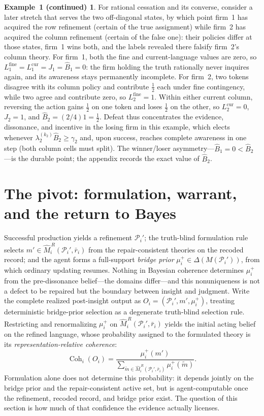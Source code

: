 \documentclass[11pt]{article}
\theoremstyle{definition}
\newtheorem*{excont}{Example~1 (continued)}
\begin{document}
\begin{excont}
For rational cessation and its converse, consider a later stretch that serves the two off-diagonal states, by which point firm~1 has acquired the row refinement (certain of the true assignment) while firm~2 has acquired the column refinement (certain of the false one): their policies differ at those states, firm~1 wins both, and the labels revealed there falsify firm~2's column theory.
For firm~1, both the fine and current-language values are zero, so $L_1^{\mathrm{fine}}=L_1^{\mathrm{cur}}=J_1=\widehat B_1=0$: the firm holding the truth rationally never inquires again, and its awareness stays permanently incomplete.
For firm~2, two tokens disagree with its column policy and contribute $\tfrac12$ each under fine contingency, while two agree and contribute zero, so $L_2^{\mathrm{fine}}=1$.
Within either current column, reversing the action gains $\tfrac12$ on one token and loses $\tfrac12$ on the other, so $L_2^{\mathrm{cur}}=0$, $J_2=1$, and $\widehat B_2=(2/4)1=\tfrac12$.
Defeat thus concentrates the evidence, dissonance, and incentive in the losing firm in this example, which elects whenever $\lambda_2^{(k_2)}\widehat B_2\geq\gamma_2$ and, upon success, reaches complete awareness in one step (both column cells must split).
The winner/loser asymmetry---$\widehat B_1=0<\widehat B_2$---is the durable point; the appendix records the exact value of $\widehat B_2$.
\end{excont}
\section{The pivot: formulation, warrant, and the return to Bayes}
\label{sec:pivot}

Successful production yields a refinement $\mathcal P_i'$; the truth-blind formulation rule selects $m'\in\widehat M_i^{\,R}(\mathcal P_i',\bar r_i)$ from the repair-consistent theories on the recoded record; and the agent forms a full-support \emph{bridge prior} $\mu_i^{+}\in\Delta(M(\mathcal P_i'))$, from which ordinary updating resumes.
Nothing in Bayesian coherence determines $\mu_i^{+}$ from the pre-dissonance belief---the domains differ---and this nonuniqueness is not a defect to be repaired but the boundary between insight and judgment.
Write the complete realized post-insight output as $O_i=(\mathcal P_i',m',\mu_i^+)$, treating deterministic bridge-prior selection as a degenerate truth-blind selection rule.
Restricting and renormalizing $\mu_i^{+}$ on $\widehat M_i^{\,R}(\mathcal P_i',\bar r_i)$ yields the initial acting belief on the refined language, whose probability assigned to the formulated theory is its \emph{representation-relative coherence}:
\begin{equation}
\operatorname{Coh}_i(O_i)
=
\frac{\mu_i^+(m')}
{\displaystyle\sum_{\widetilde m\in\widehat M_i^{\,R}(\mathcal P_i',\bar r_i)}\mu_i^+(\widetilde m)}.
\end{equation}
Formulation alone does not determine this probability: it depends jointly on the bridge prior and the repair-consistent active set, but is agent-computable once the refinement, recoded record, and bridge prior exist.
The question of this section is how much of that confidence the evidence actually licenses.
\end{document}
